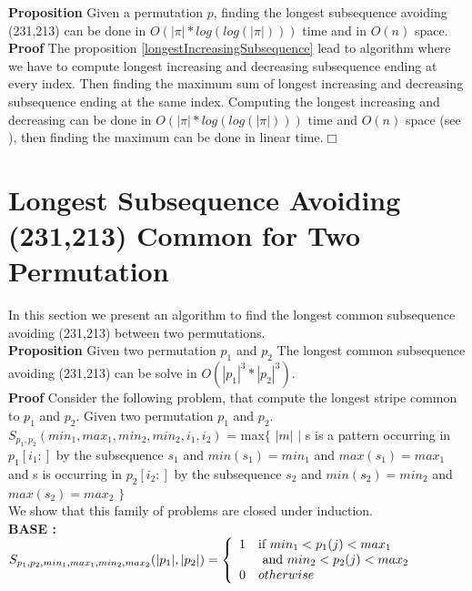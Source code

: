 \documentclass[a4paper]{llncs}
\newcommand{\ptext}{\pi}
\newcounter{num}
\newcommand{\num}{\stepcounter{num} }
\begin{document}
	\textbf{Proposition  \num \thenum}
	Given a permutation $p$, 
	finding the longest subsequence avoiding (231,213)
	can be done in $O(|\ptext|*log(log(|\ptext|)))$ time and in $O(n)$ space.\\
	
	\textbf{Proof} The proposition \ref{longestIncreasingSubsequence} lead to algorithm 
	where we have to compute longest increasing and decreasing subsequence ending at every index. Then finding the maximum sum of longest increasing and decreasing subsequence ending at the same index.
	Computing the longest increasing and decreasing can be done in $O(|\ptext|*log(log(|\ptext|)))$ time and $O(n)$ space (see \cite{Bespamyatnikh00enumeratinglongest}), then finding the maximum can be done in linear time.$\Box$\\



	\section{Longest Subsequence Avoiding \\(231,213) Common for Two Permutation}
	
	In this section we present an algorithm to find 
	the longest common subsequence avoiding (231,213) 
	between two permutations.\\
	
	\textbf{Proposition \num \thenum } Given two permutation $p_1$ and $p_2$
	The longest common subsequence
	avoiding (231,213) can be solve in $O(|p_1|^3*|p_2|^3)$.\\
	
	\textbf{Proof } Consider the following problem, 
	that compute the longest stripe common to $p_1$ and $p_2$.
	Given two permutation $p_1$ and $p_2$.\\
	
	$S_{p_1,p_2}(min_1,max_1,min_2,min_2,i_1,i_2)$
	= max$\{$ $|m|$ $|$ 
	s is a pattern occurring 
	in  $p_1[i_1:]$
	by the subsequence $s_1$ and $min(s_1)=min_1$ and $max(s_1)=max_1$
	and s is occurring
	in  $p_2[i_2:]$
	by the subsequence $s_2$ and $min(s_2)=min_2$ and $max(s_2)=max_2$	
	$\}$\\
	
	We show that this family of problems are closed under induction.\\


	\textbf{BASE :} \\
	$S_{p_1,p_2,min_1,max_1,min_2,max_2}(|p_1|,|p_2|) = \left\{ 
			\begin{array}{l l}
				1 & \text{if $min_1<p_1(j)<max_1$  
				}\\
				& \text{ and $min_2<p_2(j)<max_2$}\\
				0 & otherwise\\
			\end{array} \right. $\\	
\end{document}
